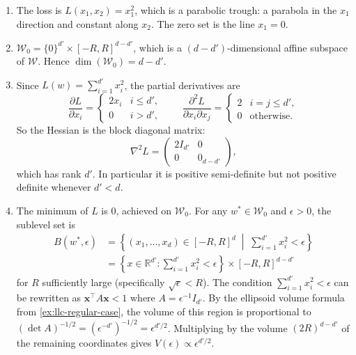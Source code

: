 \documentclass[11pt]{article}
\newcommand{\R}{\mathbb{R}}
\newcommand{\W}{\mathcal{W}}
\begin{document}
\begin{solution}
\begin{enumerate}
    \item The loss is $L(x_1, x_2) = x_1^2$, which is a parabolic trough: a parabola in the $x_1$ direction and constant along $x_2$. The zero set is the line $x_1 = 0$.
    \item $\W_0 = \{0\}^{d'} \times [-R,R]^{d-d'}$, which is a $(d - d')$-dimensional affine subspace of $\W$. Hence $\dim(\W_0) = d - d'$.
    \item Since $L(w) = \sum_{i=1}^{d'} x_i^2$, the partial derivatives are
    \[
        \frac{\partial L}{\partial x_i} = \begin{cases} 2x_i & i \leq d', \\ 0 & i > d', \end{cases}
        \qquad
        \frac{\partial^2 L}{\partial x_i \partial x_j} = \begin{cases} 2 & i = j \leq d', \\ 0 & \text{otherwise}. \end{cases}
    \]
    So the Hessian is the block diagonal matrix:
    \[
        \nabla^2 L = \begin{pmatrix} 2I_{d'} & 0 \\ 0 & 0_{d-d'} \end{pmatrix},
    \]
    which has rank $d'$. In particular it is positive semi-definite but not positive definite whenever $d' < d$.
    \item The minimum of $L$ is $0$, achieved on $\W_0$. For any $w^* \in \W_0$ and $\epsilon > 0$, the sublevel set is
    \begin{align*}
        B(w^*, \epsilon) &= \left\{ (x_1,\dots,x_d) \in [-R,R]^d \;\middle|\; \sum_{i=1}^{d'} x_i^2 < \epsilon \right\} \\
        &= \left\{x \in \R^{d'} : \sum_{i=1}^{d'} x_i^2 < \epsilon \right\} \times [-R,R]^{d-d'}
    \end{align*}
    for $R$ sufficiently large (specifically $\sqrt{\epsilon} < R$). The condition $\sum_{i=1}^{d'} x_i^2 < \epsilon$ can be rewritten as $\mathbf{x}^\top A \mathbf{x} < 1$ where $A = \epsilon^{-1} I_{d'}$. By the ellipsoid volume formula from \cref{ex:llc-regular-case}, the volume of this region is proportional to $(\det A)^{-1/2} = (\epsilon^{-d'})^{-1/2} = \epsilon^{d'/2}$. Multiplying by the volume $(2R)^{d-d'}$ of the remaining coordinates gives $V(\epsilon) \propto \epsilon^{d'/2}$. \qedhere
\end{enumerate}
\end{solution}
\end{document}
